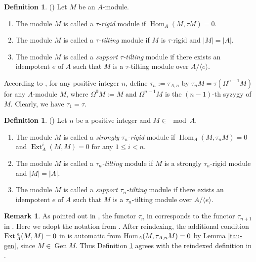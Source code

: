 \documentclass[reqno,12pt]{amsart}
\numberwithin{equation}{section}
\def\Ext{\mbox{\rm Ext}\,} \def\Hom{\mbox{\rm Hom}} \def\dim{\mbox{\rm dim}} \def\Iso{\mbox{\rm Iso}\,}
\theoremstyle{plain}
\theoremstyle{definition}
\newtheorem{definition}[theorem]{\bf Definition}
\newtheorem{remark}[theorem]{\bf Remark}
\begin{document}
\begin{definition}\label{tau} \textup{(\cite[Definition 0.1]{ADA})}
Let $M$ be an $A$-module.
\begin{enumerate}
\item[(a)] The module $M$ is called a {\em \(\tau\)-rigid} module if
    $\operatorname{Hom}_{A}(M, \tau M) = 0.$
\item[(b)] The module $M$ is called a {\em \(\tau\)-tilting} module if \( M \) is \(\tau\)-rigid and
    $|M| = |A|.$
\item[(c)] The module $M$ is called a {\em support \(\tau\)-tilting} module if there exists an idempotent \( e \) of \( A \) such that \( M \) is a \(\tau\)-tilting module over \( A / \langle e \rangle \).
\end{enumerate}
\end{definition}


According to \cite{IYA}, for any positive integer $n$, define $\tau_n:=\tau_{A,n}$ by $\tau_n M=\tau (  \Omega^{n-1} M )$ for any $A$-module $M$, where $\Omega^{0} M:=M$ and $\Omega^{n-1} M$ is the $(n-1)$-th syzygy of $M$. Clearly, we have $\tau_1=\tau$.



\begin{definition}\label{tau-n}\textup{(\cite[Definition 2.2]{MUC})}
Let $n$ be a positive integer and $M\in\mod A$.
\begin{enumerate}
\item[(a)] The module $M$ is called a {\em strongly \( \tau_n \)-rigid} module if $\operatorname{Hom}_A (M, \tau_n M) = 0$ and $\operatorname{Ext}_A^i(M, M) = 0$ for any $1\leq i<n.$
\item[(b)] The module $M$ is called a {\em \( \tau_n \)-{tilting}} module if \( M \) is a strongly \( \tau_n \)-rigid module and $ |M| = |A|$.
\item[(c)] The module $M$ is called a {\em support \( \tau_n \)-tilting} module if there exists an idempotent \( e \) of \( A \) such that \( M \) is a \( \tau_n \)-tilting module over \( A/\langle e \rangle \).
\end{enumerate}
\end{definition}


\begin{remark}\label{n-1,n}
As pointed out in \cite[Remark 2.1]{MUC} , the functor $\tau_{n}$ in \cite{IYA} corresponds to the functor $\tau_{n+1}$ in \cite{MUC}. Here we adopt the notation from \cite{IYA}.
After reindexing, the additional condition $\Ext_A^n(M,M)=0$ in \cite[Definition 2.2]{MUC} is automatic from $\Hom_A(M,\tau_{A,n}M)=0$ by Lemma \ref{tau-gen}, since $M\in\operatorname{Gen} M$. Thus Definition \ref{tau-n} agrees with the reindexed definition in \cite{MUC}.
\end{remark}
\end{document}
